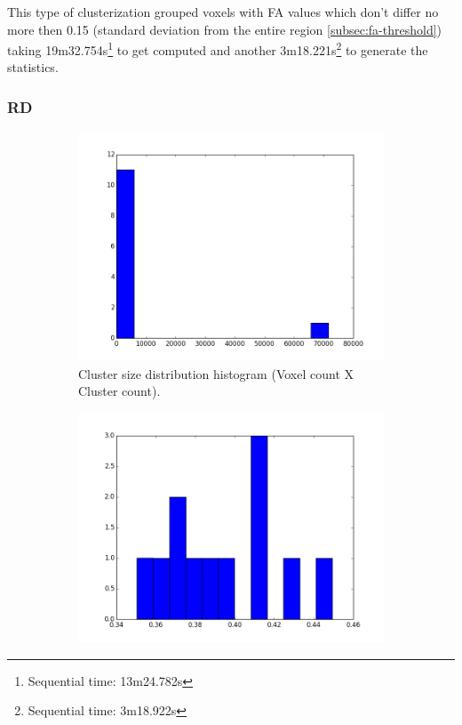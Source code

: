 \documentclass[a4paper,11pt]{report}
\begin{document}
    This type of clusterization grouped voxels with FA values which don't differ no more then 0.15 (standard deviation from the entire region \ref{subsec:fa-threshold}) taking 19m32.754s\footnote{Sequential time: 13m24.782s} to get computed and another 3m18.221s\footnote{Sequential time: 3m18.922s} to generate the statistics.

    \newpage
    \subsubsection{RD}
    \begin{figure}[!ht]
      \centering

      \begin{subfigure}[t]{.49\textwidth}
        \includegraphics[width=1\linewidth]{img/histograms/rd_clustered_fa_mask_region_sizes_hist.png}
        \caption{Cluster size distribution histogram (Voxel count X Cluster count).}
        \label{subfig:fa_hist_region}
      \end{subfigure}\hfill%
      \begin{subfigure}[t]{.49\textwidth}
        \includegraphics[width=1\linewidth]{img/histograms/rd_clustered_fa_mask_fa_means_hist.png}

\end{subfigure}
\end{figure}
\end{document}
